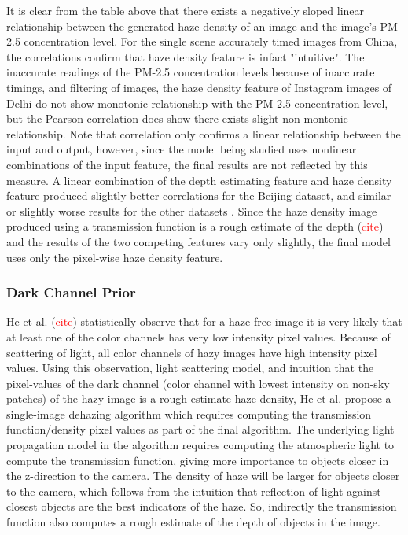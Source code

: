 \documentclass{article}
\begin{document}
It is clear from the table above that there exists a negatively sloped linear relationship between the generated haze density of an image and the image's PM-2.5 concentration level. For the single scene accurately timed images from China, the correlations confirm that haze density feature is infact "intuitive". The inaccurate readings of the PM-2.5 concentration levels because of inaccurate timings, and filtering of images, the haze density feature of Instagram images of Delhi do not show monotonic relationship with the PM-2.5 concentration level, but the Pearson correlation does show there exists slight non-montonic relationship. Note that correlation only confirms a linear relationship between the input and output, however, since the model being studied uses nonlinear combinations of the input feature, the final results are not reflected by this measure. A linear combination of the depth estimating feature and haze density feature produced slightly better correlations for the Beijing dataset, and similar or slightly worse results for the other datasets \cite{Usergen}. Since the haze density image produced using a transmission function is a rough estimate of the depth (\textcolor{red}{cite}) and the results of the two competing features vary only slightly, the final model uses only the pixel-wise haze density feature.

\subsubsection{Dark Channel Prior}
He et al. (\textcolor{red}{cite}) statistically observe that for a haze-free image it is very likely that at least one of the color channels has very low intensity pixel values. Because of scattering of light, all color channels of hazy images have high intensity pixel values. Using this observation, light scattering model, and intuition that the pixel-values of the dark channel (color channel with lowest intensity on non-sky patches) of the hazy image is a rough estimate haze density, He et al. propose a single-image dehazing algorithm which requires computing the transmission function/density pixel values as part of the final algorithm. The underlying light propagation model in the algorithm requires computing the atmospheric light to compute the transmission function, giving more importance to objects closer in the z-direction to the camera. The density of haze will be larger for objects closer to the camera, which follows from the intuition that reflection of light against closest objects are the best indicators of the haze. So, indirectly the transmission function also computes a rough estimate of the depth of objects in the image.
\end{document}

